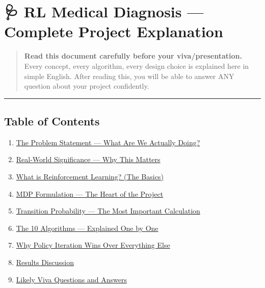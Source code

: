 \documentclass[
]{article}
\author{}
\date{}
\providecommand{\tightlist}{%
  \setlength{\itemsep}{0pt}\setlength{\parskip}{0pt}}
\begin{document}
\hypertarget{rl-medical-diagnosis-complete-project-explanation}{%
\section{🩺 RL Medical Diagnosis --- Complete Project
Explanation}\label{rl-medical-diagnosis-complete-project-explanation}}

\begin{quote}
\textbf{Read this document carefully before your viva/presentation.}
Every concept, every algorithm, every design choice is explained here in
simple English. After reading this, you will be able to answer ANY
question about your project confidently.
\end{quote}

\begin{center}\rule{0.5\linewidth}{0.5pt}\end{center}

\hypertarget{table-of-contents}{%
\subsection{Table of Contents}\label{table-of-contents}}

\begin{enumerate}
\def\labelenumi{\arabic{enumi}.}
\tightlist
\item
  \protect\hyperlink{1-the-problem-statement}{The Problem Statement ---
  What Are We Actually Doing?}
\item
  \protect\hyperlink{2-real-world-significance}{Real-World Significance
  --- Why This Matters}
\item
  \protect\hyperlink{3-what-is-reinforcement-learning}{What is
  Reinforcement Learning? (The Basics)}
\item
  \protect\hyperlink{4-mdp-formulation}{MDP Formulation --- The Heart of
  the Project}
\item
  \protect\hyperlink{5-transition-probability}{Transition Probability
  --- The Most Important Calculation}
\item
  \protect\hyperlink{6-the-10-algorithms}{The 10 Algorithms ---
  Explained One by One}
\item
  \protect\hyperlink{7-why-policy-iteration-wins}{Why Policy Iteration
  Wins Over Everything Else}
\item
  \protect\hyperlink{8-results-discussion}{Results Discussion}
\item
  \protect\hyperlink{9-likely-viva-questions-and-answers}{Likely Viva
  Questions and Answers}
\end{enumerate}
\end{document}
